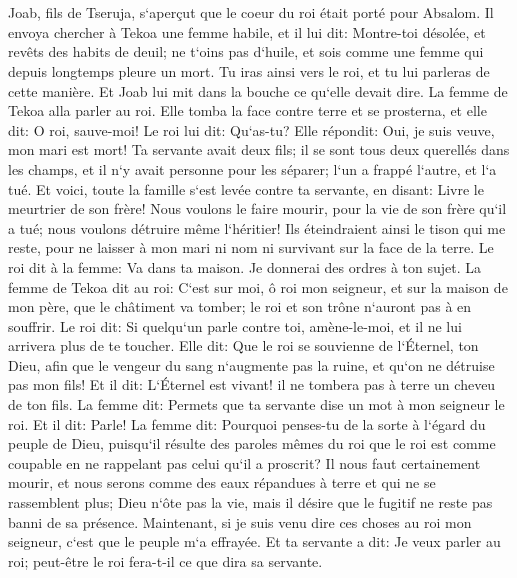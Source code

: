 \chapter{}

\verse Joab, fils de Tseruja, s`aperçut que le coeur du roi était porté pour Absalom. 
\verse Il envoya chercher à Tekoa une femme habile, et il lui dit: Montre-toi désolée, et revêts des habits de deuil; ne t`oins pas d`huile, et sois comme une femme qui depuis longtemps pleure un mort. 
\verse Tu iras ainsi vers le roi, et tu lui parleras de cette manière. Et Joab lui mit dans la bouche ce qu`elle devait dire. 
\verse La femme de Tekoa alla parler au roi. Elle tomba la face contre terre et se prosterna, et elle dit: O roi, sauve-moi! 
\verse Le roi lui dit: Qu`as-tu? Elle répondit: Oui, je suis veuve, mon mari est mort! 
\verse Ta servante avait deux fils; il se sont tous deux querellés dans les champs, et il n`y avait personne pour les séparer; l`un a frappé l`autre, et l`a tué. 
\verse Et voici, toute la famille s`est levée contre ta servante, en disant: Livre le meurtrier de son frère! Nous voulons le faire mourir, pour la vie de son frère qu`il a tué; nous voulons détruire même l`héritier! Ils éteindraient ainsi le tison qui me reste, pour ne laisser à mon mari ni nom ni survivant sur la face de la terre. 
\verse Le roi dit à la femme: Va dans ta maison. Je donnerai des ordres à ton sujet. 
\verse La femme de Tekoa dit au roi: C`est sur moi, ô roi mon seigneur, et sur la maison de mon père, que le châtiment va tomber; le roi et son trône n`auront pas à en souffrir. 
\verse Le roi dit: Si quelqu`un parle contre toi, amène-le-moi, et il ne lui arrivera plus de te toucher. 
\verse Elle dit: Que le roi se souvienne de l`Éternel, ton Dieu, afin que le vengeur du sang n`augmente pas la ruine, et qu`on ne détruise pas mon fils! Et il dit: L`Éternel est vivant! il ne tombera pas à terre un cheveu de ton fils. 
\verse La femme dit: Permets que ta servante dise un mot à mon seigneur le roi. Et il dit: Parle! 
\verse La femme dit: Pourquoi penses-tu de la sorte à l`égard du peuple de Dieu, puisqu`il résulte des paroles mêmes du roi que le roi est comme coupable en ne rappelant pas celui qu`il a proscrit? 
\verse Il nous faut certainement mourir, et nous serons comme des eaux répandues à terre et qui ne se rassemblent plus; Dieu n`ôte pas la vie, mais il désire que le fugitif ne reste pas banni de sa présence. 
\verse Maintenant, si je suis venu dire ces choses au roi mon seigneur, c`est que le peuple m`a effrayée. Et ta servante a dit: Je veux parler au roi; peut-être le roi fera-t-il ce que dira sa servante. 

